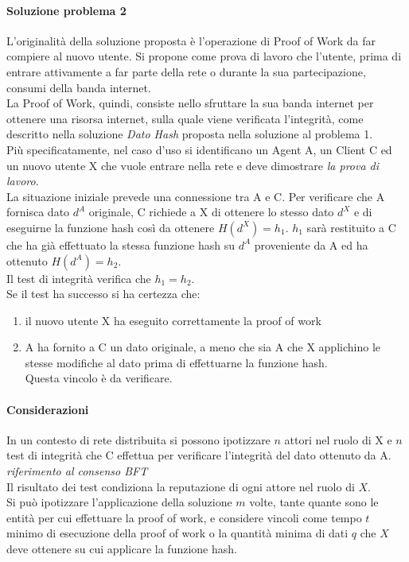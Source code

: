 	\paragraph{Soluzione problema 2}
	L'originalità della soluzione proposta è l'operazione di Proof of Work da far compiere al nuovo utente. Si propone come prova di lavoro che l'utente, prima di entrare attivamente a far parte della rete o durante la sua partecipazione, consumi della banda internet.\\
	La Proof of Work, quindi, consiste nello sfruttare la sua banda internet per ottenere una risorsa internet, sulla quale viene verificata l'integrità, come descritto nella soluzione \textit{Dato Hash} proposta nella soluzione al problema 1.\\ 
	Più specificatamente, nel caso d'uso si identificano un Agent A, un Client C ed un nuovo utente X che vuole entrare nella rete e deve dimostrare \textit{la prova di lavoro}.\\
	La situazione iniziale prevede una connessione tra A e C. Per verificare che A fornisca dato $d^A$ originale, C richiede a X di ottenere lo stesso dato $d^X$ e di eseguirne la funzione hash così da ottenere  $H(d^X)=h_1$. $h_1$ sarà restituito a C che ha già effettuato la stessa funzione hash su $d^A$ proveniente da A ed ha ottenuto $H(d^A) = h_2$.\\
	Il test di integrità verifica che $h_1 = h_2$.\\
	Se il test ha successo si ha certezza che:
	\begin{enumerate}
		\item il nuovo utente X ha eseguito correttamente la proof of work 
		\item A ha fornito a C un dato originale, a meno che sia A che X applichino le stesse modifiche al dato prima di effettuarne la funzione hash.\\Questa vincolo è da verificare.
	\end{enumerate}
	
	\paragraph{Considerazioni}
	In un contesto di rete distribuita si possono ipotizzare $n$ attori nel ruolo di X e $n$ test di integrità che C effettua per verificare l'integrità del dato ottenuto da A. \textit{riferimento al consenso BFT}\\
	Il risultato dei test condiziona la reputazione di ogni attore nel ruolo di $X$.\\
	Si può ipotizzare l'applicazione della soluzione $m$ volte, tante quante sono le entità per cui effettuare la proof of work, e considere vincoli come tempo $t$ minimo di esecuzione della proof of work o la quantità minima di dati $q$ che $X$ deve ottenere su cui applicare la funzione hash.\\
	
